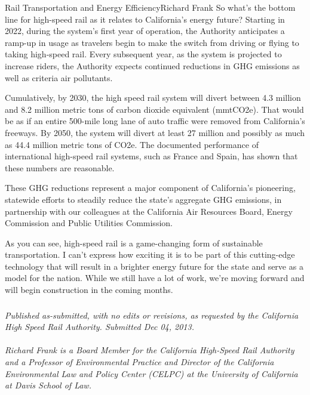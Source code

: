 \documentclass[10pt]{papertex}
\begin{document}
\begin{news}{2}{Rail Transportation and Energy Efficiency}{Richard Frank}{}{}
So what’s the bottom line for high-speed rail as it relates to California’s 
energy future? Starting in 2022, during the system’s first year of operation, 
the Authority anticipates a ramp-up in usage as travelers begin to make the 
switch from driving or flying to taking high-speed rail. Every subsequent year, 
as the system is projected to increase riders, the Authority expects continued 
reductions in GHG emissions as well as criteria air pollutants.

Cumulatively, by 2030, the high speed rail system will divert between 4.3 
million and 8.2 million metric tons of carbon dioxide equivalent (mmtCO2e).  
That would be as if an entire 500-mile long lane of auto traffic were removed 
from California’s freeways.  By 2050, the system will divert at least 27 
million and possibly as much as 44.4 million metric tons of CO2e.  The 
documented performance of international high-speed rail systems, such as France 
and Spain, has shown that these numbers are reasonable.

These GHG reductions represent a major component of California’s pioneering, 
statewide efforts to steadily reduce the state’s aggregate GHG emissions, in 
partnership with our colleagues at the California Air Resources Board, Energy 
Commission and Public Utilities Commission.

As you can see, high-speed rail is a game-changing form of sustainable 
transportation. I can’t express how exciting it is to be part of this 
cutting-edge technology that will result in a brighter energy future for the 
state and serve as a model for the nation. While we still have a lot of work, 
we’re moving forward and will begin construction in the coming months.

\subsubsection*{}

\emph{Published as-submitted, with no edits or revisions, as requested by the 
California High Speed Rail Authority. Submitted Dec 04, 2013.}
\\
\\
\emph{Richard Frank is a Board Member for the California High-Speed Rail 
Authority and a Professor of Environmental Practice and Director of the 
California Environmental Law and Policy Center (CELPC) at the University of 
California at Davis School of Law.}

\end{news}
\end{document}
